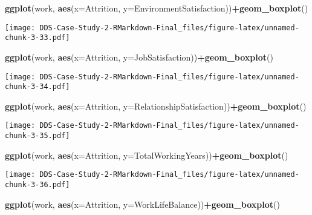 \documentclass[]{article}
\newenvironment{Shaded}{\begin{snugshade}}{\end{snugshade}}
\newcommand{\DataTypeTok}[1]{\textcolor[rgb]{0.13,0.29,0.53}{#1}}
\newcommand{\KeywordTok}[1]{\textcolor[rgb]{0.13,0.29,0.53}{\textbf{#1}}}
\newcommand{\NormalTok}[1]{#1}
\newcommand{\OperatorTok}[1]{\textcolor[rgb]{0.81,0.36,0.00}{\textbf{#1}}}
\begin{document}
\begin{Shaded}
\begin{Highlighting}[]
\KeywordTok{ggplot}\NormalTok{(work, }\KeywordTok{aes}\NormalTok{(}\DataTypeTok{x=}\NormalTok{Attrition, }\DataTypeTok{y=}\NormalTok{EnvironmentSatisfaction))}\OperatorTok{+}\KeywordTok{geom_boxplot}\NormalTok{()}
\end{Highlighting}
\end{Shaded}

\texttt{[image: DDS-Case-Study-2-RMarkdown-Final\_files/figure-latex/unnamed-chunk-3-33.pdf]}

\begin{Shaded}
\begin{Highlighting}[]
\KeywordTok{ggplot}\NormalTok{(work, }\KeywordTok{aes}\NormalTok{(}\DataTypeTok{x=}\NormalTok{Attrition, }\DataTypeTok{y=}\NormalTok{JobSatisfaction))}\OperatorTok{+}\KeywordTok{geom_boxplot}\NormalTok{()}
\end{Highlighting}
\end{Shaded}

\texttt{[image: DDS-Case-Study-2-RMarkdown-Final\_files/figure-latex/unnamed-chunk-3-34.pdf]}

\begin{Shaded}
\begin{Highlighting}[]
\KeywordTok{ggplot}\NormalTok{(work, }\KeywordTok{aes}\NormalTok{(}\DataTypeTok{x=}\NormalTok{Attrition, }\DataTypeTok{y=}\NormalTok{RelationshipSatisfaction))}\OperatorTok{+}\KeywordTok{geom_boxplot}\NormalTok{()}
\end{Highlighting}
\end{Shaded}

\texttt{[image: DDS-Case-Study-2-RMarkdown-Final\_files/figure-latex/unnamed-chunk-3-35.pdf]}

\begin{Shaded}
\begin{Highlighting}[]
\KeywordTok{ggplot}\NormalTok{(work, }\KeywordTok{aes}\NormalTok{(}\DataTypeTok{x=}\NormalTok{Attrition, }\DataTypeTok{y=}\NormalTok{TotalWorkingYears))}\OperatorTok{+}\KeywordTok{geom_boxplot}\NormalTok{()}
\end{Highlighting}
\end{Shaded}

\texttt{[image: DDS-Case-Study-2-RMarkdown-Final\_files/figure-latex/unnamed-chunk-3-36.pdf]}

\begin{Shaded}
\begin{Highlighting}[]
\KeywordTok{ggplot}\NormalTok{(work, }\KeywordTok{aes}\NormalTok{(}\DataTypeTok{x=}\NormalTok{Attrition, }\DataTypeTok{y=}\NormalTok{WorkLifeBalance))}\OperatorTok{+}\KeywordTok{geom_boxplot}\NormalTok{()}
\end{Highlighting}
\end{Shaded}
\end{document}
